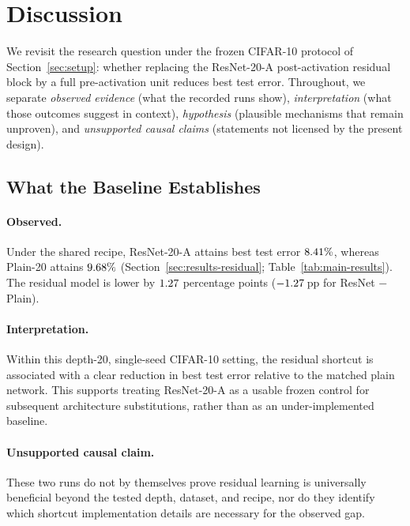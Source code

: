 \section{Discussion}
\label{sec:discussion}


We revisit the research question under the frozen CIFAR-10 protocol of
Section~\ref{sec:setup}:
whether replacing the ResNet-20-A post-activation residual block by a full
pre-activation unit reduces best test error.
Throughout, we separate \emph{observed evidence} (what the recorded runs show),
\emph{interpretation} (what those outcomes suggest in context),
\emph{hypothesis} (plausible mechanisms that remain unproven),
and \emph{unsupported causal claims} (statements not licensed by the present design).

\subsection{What the Baseline Establishes}
\label{sec:disc-baseline}

\paragraph{Observed.}
Under the shared recipe, ResNet-20-A attains best test error $8.41\%$,
whereas Plain-20 attains $9.68\%$
(Section~\ref{sec:results-residual}; Table~\ref{tab:main-results}).
The residual model is lower by $1.27$ percentage points
($-1.27$\,pp for ResNet $-$ Plain).

\paragraph{Interpretation.}
Within this depth-20, single-seed CIFAR-10 setting, the residual shortcut is associated
with a clear reduction in best test error relative to the matched plain network.
This supports treating ResNet-20-A as a usable frozen control for subsequent architecture
substitutions, rather than as an under-implemented baseline.

\paragraph{Unsupported causal claim.}
These two runs do not by themselves prove residual learning is universally beneficial
beyond the tested depth, dataset, and recipe, nor do they identify which shortcut
implementation details are necessary for the observed gap.


